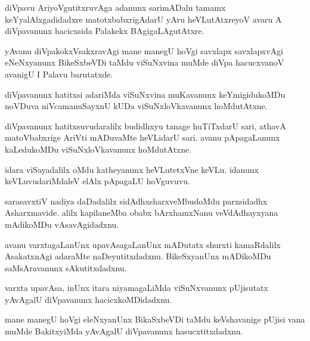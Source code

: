 \documentclass{article}
\begin{document}
\begin{mn}%
diVpavu AriyoVgutitxruvAga adanunx sarimADalu tamamx keYyalAlxgadidadxre matotxbabxrigAdarU yAru 
heVLutAtxreyoV avaru A diVpavanunx hacicxsida Palakekx BAgigaLAgutAtxre.
\end{mn}

\begin{mn}%
yAvanu diVpakokxVsakxravAgi mane manegU hoVgi savxlapx savxlapxvAgi eNeNxyanunx BikeSxbeVDi taMdu 
viSuNxvina muMde diVpa hacucxvanoV avanigU I Palavu barutatxde.
\end{mn}

\begin{mn}%
diVpavanunx hatitxsi adariMda viSuNxvina muKavanunx keYmigidukoMDu noVDuva niVcamanuSayxnU kUDa 
viSuNxloVkavanunx hoMdutAtxne.
\end{mn}

\begin{mn}%
diVpavanunx hatitxsuvudaralilx budidhxyu tanage huTiTxdarU sari, athavA matoVbabxrige AriVti 
mADuvaMte heVLidarU sari. avanu pApagaLanunx kaLedukoMDu viSuNxloVkavanunx hoMdutAtxne.
\end{mn}

\begin{mn}%
idara viSayadalilx oMdu katheyanunx heVLutetxVne keVLu. idanunx keVLuvudariMdaleV elAlx pApagaLU 
hoVguvuvu. 
\end{mn}

\begin{mn}%
sarasavxtiV nadiya daDadalilx sidAdhxsharxveMbudoMdu parxsidadhx Asharxmavide. alilx kapilaneMba 
obabx bArxhamxNanu veVdAdhayxyana mAdikoMDu vAsavAgidadxnu.
\end{mn}

\begin{mn}%
avanu varxtagaLanUnx upavAsagaLanUnx mADutatx shurxti kamaRdalilx AsakatxnAgi adaraMte 
naDeyutitxdadxnu. BikeSxyanUnx mADikoMDu saMsAravanunx sAkutitxdadxnu.
\end{mn}

\begin{mn}%
varxta upavAsa, inUnx itara niyamagaLiMda viSuNxvanunx pUjisutatx yAvAgalU diVpavanunx 
hacicxkoMDidadxnu.
\end{mn}

\begin{mn}%
mane manegU hoVgi eleNxyanUnx BikaSxbeVDi taMdu keVshavanige pUjisi vana muMde BakitxyiMda yAvAgalU 
diVpavanunx hasucxtitxdadxnu.
\end{mn}
\end{document}
